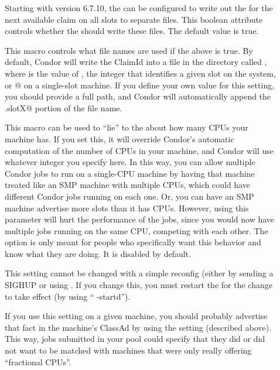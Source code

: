 \begin{description}
\item[] \label{param:StartdShouldWriteClaimIdFile}
  Starting with version 6.7.10, the  can be configured
  to write out the  for the next available claim on all
  slots to separate files.
  This boolean attribute controls whether the  should
  write these files.
  The default value is true.
  
\item[] \label{param:StartdClaimIdFile}
  This macro controls what file names are used if the above
   is true.  By
  default, Condor will write the ClaimId into a file in the
   directory called , where
  \verb@X@ is the value of , the integer that
  identifies a given slot on the system, or @ on a
  single-slot machine.
  If you define your own value for this setting, you should provide a
  full path, and Condor will automatically append the \verb@.slotX@
  portion of the file name.

\item[] \label{param:NumCpus}
  This macro can be used to ``lie'' to the  about how many CPUs
  your machine has.
  If you set this, it will override Condor's automatic computation of
  the number of CPUs in your machine, and Condor will use whatever
  integer you specify here. 
  In this way, you can allow multiple Condor jobs to run on a
  single-CPU machine by having that machine treated like an SMP
  machine with multiple CPUs, which could have different Condor jobs
  running on each one.
  Or, you can have an SMP machine advertise more slots than
  it has CPUs.
  However, using this parameter will hurt the performance of the jobs,
  since you would now have multiple jobs running on the same CPU,
  competing with each other.
  The option is only meant for people who specifically want this
  behavior and know what they are doing.  
  It is disabled by default.

  \Note This setting cannot be changed with a simple reconfig (either
  by sending a SIGHUP or using .
  If you change this, you must restart the  for the
  change to take effect (by using `` -startd'').

  \Note If you use this setting on a given machine, you should
  probably advertise that fact in the machine's ClassAd by using the
   setting (described above).
  This way, jobs submitted in your pool could specify that they did or
  did not want to be matched with machines that were only really
  offering ``fractional CPUs''.


\end{description}
